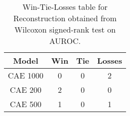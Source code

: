 \begin{table}
\centering
\caption{Win-Tie-Losses table for Reconstruction obtained from Wilcoxon signed-rank test on AUROC.}
\label{tab:reconstruction_model_training_data_comparison_AUROC}
\begin{tabular}{|c|c|c|c|}
\toprule
\textbf{Model} &  \textbf{Win} &  \textbf{Tie} &  \textbf{Losses} \\
\midrule
      CAE 1000 &             0 &             0 &                2 \\
       CAE 200 &             2 &             0 &                0 \\
       CAE 500 &             1 &             0 &                1 \\
\bottomrule
\end{tabular}
\end{table}
